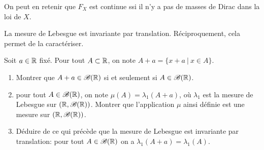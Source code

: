 {\begin{td-sol}[]
\begin{enumerate}
            On peut en retenir que \(F_X\) est continue ssi 
            il n'y a pas de masses de Dirac dans la loi de \(X\).
        \end{enumerate}
    \end{td-sol}
}{}

\begin{remark}
    La mesure de Lebesgue est invariante par translation. Réciproquement, cela permet de la caractériser.
\end{remark}

\begin{td-exo}
    Soit \(a\in\mathbb{R}\) fixé. Pour tout \(A\subset\mathbb{R}\), on note \(A+a=\{x+a\ |\ x\in A\}\).
    \begin{enumerate}
        \item Montrer que \(A+a\in\mathscr{B}(\mathbb{R})\) si et seulement si \(A\in\mathscr{B}(\mathbb{R})\).
        \item pour tout \(A\in\mathscr{B}(\mathbb{R})\), on note \(\mu(A)=\lambda_1(A+a)\), où \(\lambda_1\) est la mesure de Lebesgue sur \((\mathbb{R},\mathscr{B}(\mathbb{R}))\). Montrer que l'application \(\mu\) ainsi définie est une mesure sur \((\mathbb{R},\mathscr{B}(\mathbb{R}))\).
        \item Déduire de ce qui précède que la mesure de Lebesgue est invariante par translation: pour tout \(A\in\mathscr{B}(\mathbb{R})\) on a \(\lambda_1(A+a)=\lambda_1(A)\).
    \end{enumerate}
\end{td-exo}
